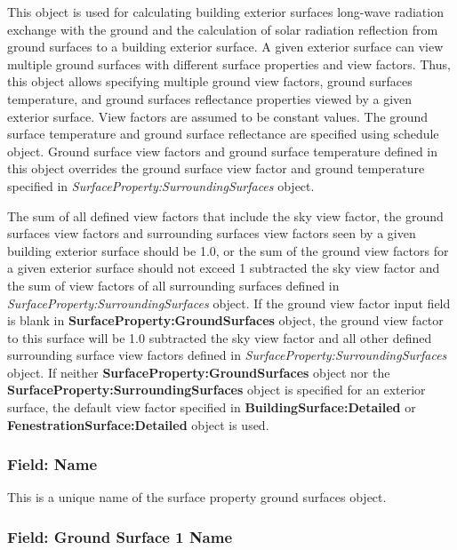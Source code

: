 This object is used for calculating building exterior surfaces long-wave radiation exchange with the ground and the calculation of solar radiation reflection from ground surfaces to a building exterior surface. A given exterior surface can view multiple ground surfaces with different surface properties and view factors. Thus, this object allows specifying multiple ground view factors, ground surfaces temperature, and ground surfaces reflectance properties viewed by a given exterior surface. View factors are assumed to be constant values. The ground surface temperature and ground surface reflectance are specified using schedule object. Ground surface view factors and ground surface temperature defined in this object overrides the ground surface view factor and ground temperature specified in \textit{SurfaceProperty:SurroundingSurfaces} object.

The sum of all defined view factors that include the sky view factor, the ground surfaces view factors and surrounding surfaces view factors seen by a given building exterior surface should be 1.0, or the sum of the ground view factors for a given exterior surface should not exceed 1 subtracted the sky view factor and the sum of view factors of all surrounding surfaces defined in \textit{SurfaceProperty:SurroundingSurfaces} object. If the ground view factor input field is blank in \textbf{SurfaceProperty:GroundSurfaces} object, the ground view factor to this surface will be 1.0 subtracted the sky view factor and all other defined surrounding surface view factors defined in \textit{SurfaceProperty:SurroundingSurfaces} object. If neither \textbf{SurfaceProperty:GroundSurfaces} object nor the \textbf{SurfaceProperty:SurroundingSurfaces} object is specified for an exterior surface, the default view factor specified in \textbf{BuildingSurface:Detailed} or \textbf{FenestrationSurface:Detailed} object is used.

\subsubsection{Field: Name}\label{field-gnd-surfs-name}

This is a unique name of the surface property ground surfaces object.

\subsubsection{Field: Ground Surface 1 Name}\label{field-ground-surface-1-name}


